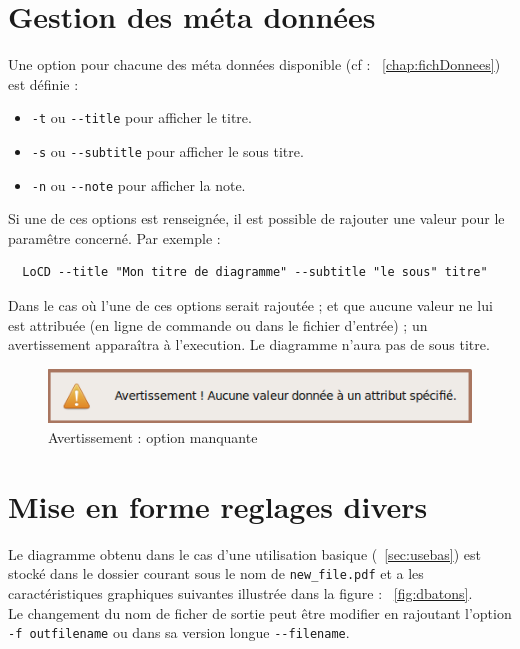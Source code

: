 \section{Gestion des méta données}
Une option pour chacune des méta données disponible (cf : ~\ref{chap:fichDonnees}) est définie :
\begin{itemize}
\item
\verb+-t+ ou \verb+--title+ pour afficher le \gls{titre}. 
\item
\verb+-s+ ou \verb+--subtitle+ pour afficher le \gls{sous titre}.
\item
\verb+-n+ ou \verb+--note+ pour afficher la \gls{note}.
\end{itemize}
Si une de ces options est renseignée, il est possible de rajouter une valeur pour le paramêtre concerné. Par exemple : 
\begin{verbatim}
  LoCD --title "Mon titre de diagramme" --subtitle "le sous" titre"
\end{verbatim} 
Dans le cas où l'une de ces options serait rajoutée ; et que aucune valeur ne lui est attribuée (en ligne de commande ou dans le fichier d'entrée) ; un avertissement apparaîtra à l'execution. Le diagramme n'aura pas de sous titre.
  \begin{figure}[htbp]
    \centering
    \includegraphics[scale=0.90]{img/aattributs}
    \caption{Avertissement : option manquante}
    \label{fig:optmissing}
  \end{figure}  

\section{Mise en forme reglages divers}
Le diagramme obtenu dans le cas d'une utilisation basique (~\ref{sec:usebas}) est stocké dans le dossier courant sous le nom de \verb+new_file.pdf+ et a les caractéristiques graphiques suivantes illustrée dans la figure :  ~\ref{fig:dbatons}.\\ Le changement du nom de ficher de sortie peut être modifier en rajoutant l'option \verb+-f outfilename+ ou dans sa version longue \verb+--filename+. 
